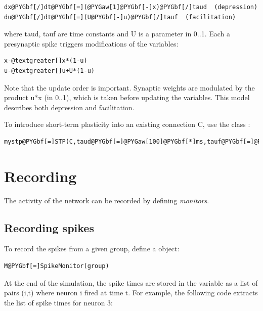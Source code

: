 \documentclass[letterpaper,10pt,english]{manual}
\begin{document}
\begin{Verbatim}[commandchars=@\[\]]
dx@PYGbf[/]dt@PYGbf[=](@PYGaw[1]@PYGbf[-]x)@PYGbf[/]taud  (depression)
du@PYGbf[/]dt@PYGbf[=](U@PYGbf[-]u)@PYGbf[/]tauf  (facilitation)
\end{Verbatim}

where taud, tauf are time constants and U is a parameter in 0..1.
Each a presynaptic spike triggers modifications of the variables:

\begin{Verbatim}[commandchars=@\[\]]
x-@textgreater[]x*(1-u)
u-@textgreater[]u+U*(1-u)
\end{Verbatim}

Note that the update order is important.
Synaptic weights are modulated by the product u*x (in 0..1), which is taken
before updating the variables. This model describes both depression and
facilitation.

To introduce short-term plasticity into an existing connection C, use the class
\hyperlink{brian.STP}{}:

\begin{Verbatim}[commandchars=@\[\]]
mystp@PYGbf[=]STP(C,taud@PYGbf[=]@PYGaw[100]@PYGbf[*]ms,tauf@PYGbf[=]@PYGaw[5]@PYGbf[*]ms,U@PYGbf[=]@PYGbf[.]@PYGaw[6])
\end{Verbatim}

\resetcurrentobjects
\hypertarget{--doc-recording}{}

\section{Recording}

The activity of the network can be recorded by defining \emph{monitors}.


\subsection{Recording spikes}

To record the spikes from a given group, define a \hyperlink{brian.SpikeMonitor}{} object:

\begin{Verbatim}[commandchars=@\[\]]
M@PYGbf[=]SpikeMonitor(group)
\end{Verbatim}

At the end of the simulation, the spike times are stored in the variable  as
a list of pairs (i,t) where neuron i fired at time t. For example, the following code extracts
the list of spike times for neuron 3:
\end{document}
